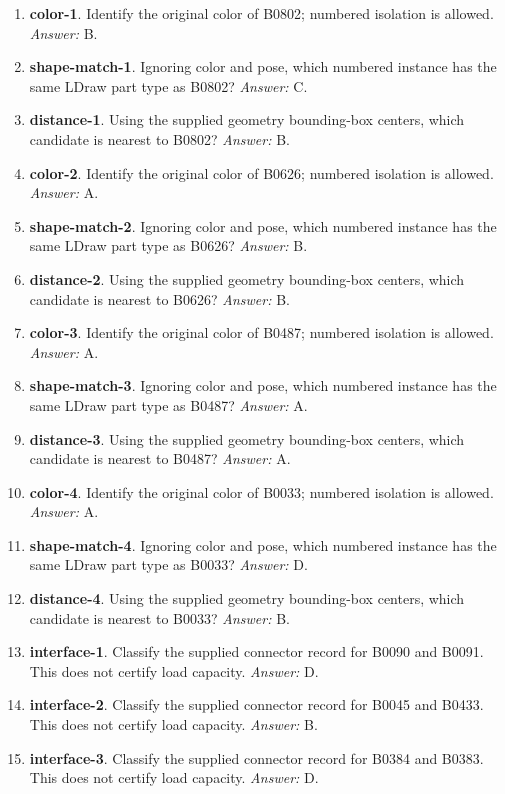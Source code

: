 \begin{enumerate}
\item \textbf{color-1}. Identify the original color of B0802; numbered isolation is allowed. \textit{Answer:} B.
\item \textbf{shape-match-1}. Ignoring color and pose, which numbered instance has the same LDraw part type as B0802? \textit{Answer:} C.
\item \textbf{distance-1}. Using the supplied geometry bounding-box centers, which candidate is nearest to B0802? \textit{Answer:} B.
\item \textbf{color-2}. Identify the original color of B0626; numbered isolation is allowed. \textit{Answer:} A.
\item \textbf{shape-match-2}. Ignoring color and pose, which numbered instance has the same LDraw part type as B0626? \textit{Answer:} B.
\item \textbf{distance-2}. Using the supplied geometry bounding-box centers, which candidate is nearest to B0626? \textit{Answer:} B.
\item \textbf{color-3}. Identify the original color of B0487; numbered isolation is allowed. \textit{Answer:} A.
\item \textbf{shape-match-3}. Ignoring color and pose, which numbered instance has the same LDraw part type as B0487? \textit{Answer:} A.
\item \textbf{distance-3}. Using the supplied geometry bounding-box centers, which candidate is nearest to B0487? \textit{Answer:} A.
\item \textbf{color-4}. Identify the original color of B0033; numbered isolation is allowed. \textit{Answer:} A.
\item \textbf{shape-match-4}. Ignoring color and pose, which numbered instance has the same LDraw part type as B0033? \textit{Answer:} D.
\item \textbf{distance-4}. Using the supplied geometry bounding-box centers, which candidate is nearest to B0033? \textit{Answer:} B.
\item \textbf{interface-1}. Classify the supplied connector record for B0090 and B0091. This does not certify load capacity. \textit{Answer:} D.
\item \textbf{interface-2}. Classify the supplied connector record for B0045 and B0433. This does not certify load capacity. \textit{Answer:} B.
\item \textbf{interface-3}. Classify the supplied connector record for B0384 and B0383. This does not certify load capacity. \textit{Answer:} D.

\end{enumerate}
